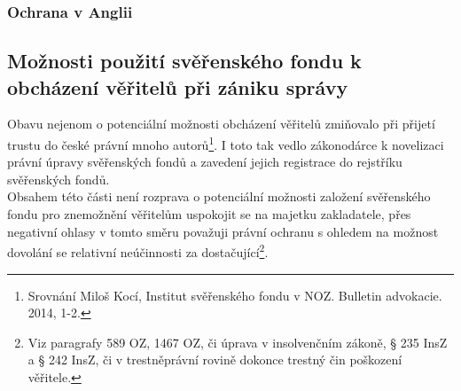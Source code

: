 \documentclass{article}
\begin{document}

\subsubsection{Ochrana v Anglii}





\subsection{Možnosti použití svěřenského fondu k obcházení věřitelů při zániku správy}

Obavu nejenom o potenciální možnosti obcházení věřitelů zmiňovalo při přijetí trustu do české právní mnoho autorů\footnote{Srovnání Miloš Kocí, Institut svěřenského fondu v NOZ. Bulletin advokacie. 2014, 1-2.}. I toto tak vedlo zákonodárce k novelizaci právní úpravy svěřenských fondů a zavedení jejich registrace do rejstříku svěřenských fondů.\\

Obsahem této části není rozprava o potenciální možnosti založení svěřenského fondu pro znemožnění věřitelům uspokojit se na majetku zakladatele, přes negativní ohlasy v tomto směru považuji právní ochranu s ohledem na možnost dovolání se relativní neúčinnosti za dostačující\footnote{Viz paragrafy 589 OZ, 1467 OZ, či úprava v insolvenčním zákoně, § 235 InsZ a § 242 InsZ, či v trestněprávní rovině dokonce trestný čin poškození věřitele.}.\\
\end{document}
